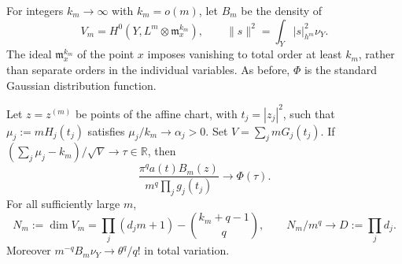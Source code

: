 For integers $k_m\to\infty$ with $k_m=o(m)$, let $B_m$ be the density of
\[
 V_m=H^0(Y,L^m\otimes\mathfrak m_x^{k_m}),\qquad
 \|s\|^2=\int_Y|s|_{h^m}^2\nu_Y.
\]
The ideal $\mathfrak m_x^{k_m}$ of the point $x$ imposes vanishing to total order at least $k_m$, rather than separate orders in the individual variables. As before, $\Phi$ is the standard Gaussian distribution function.

\begin{theorem}\label{thm:anisotropic-growing-jets}
Let $z=z^{(m)}$ be points of the affine chart, with $t_j=|z_j|^2$, such that $\mu_j:=mH_j(t_j)$ satisfies
$\mu_j/k_m\to\alpha_j>0$. Set $V=\sum_jmG_j(t_j)$. If $(\sum_j\mu_j-k_m)/\sqrt V\to\tau\in\mathbb R$, then
\begin{equation}\label{eq:anisotropic-growing-transition}
 \frac{\pi^q a(t)B_m(z)}{m^q\prod_jg_j(t_j)}\longrightarrow\Phi(\tau).
\end{equation}
For all sufficiently large $m$,
\begin{equation}\label{eq:anisotropic-jet-dimension}
 N_m:=\dim V_m=\prod_j(d_jm+1)-\binom{k_m+q-1}{q},
 \qquad N_m/m^q\longrightarrow D:=\prod_jd_j.
\end{equation}
Moreover $m^{-q}B_m\nu_Y\to\theta^q/q!$ in total variation.
\end{theorem}
